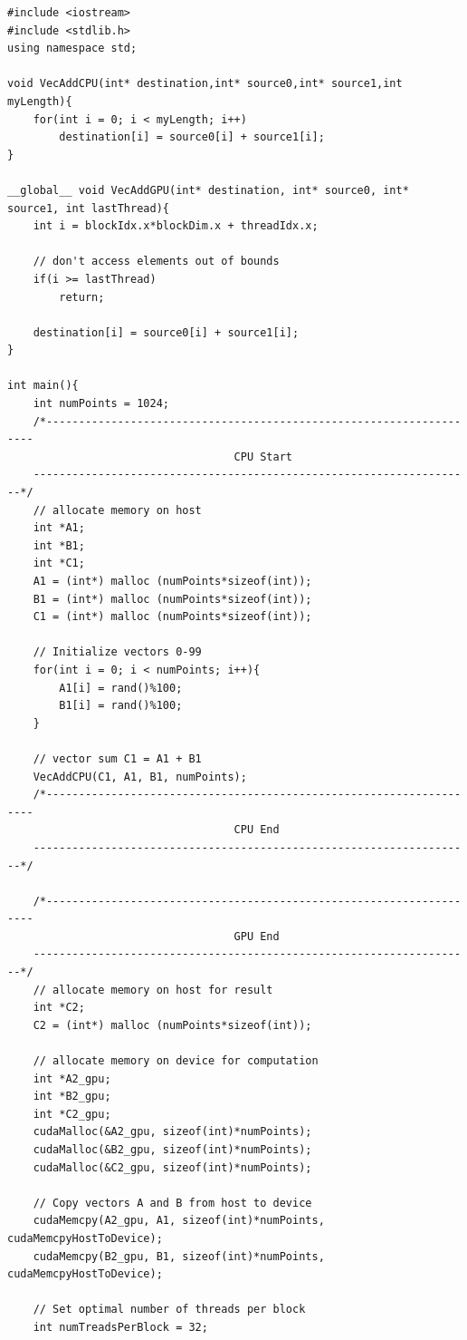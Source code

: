 \singlespacing
\clearpage
\begin{lstlisting}[caption={Comparison of CPU verse GPU code.},label={code:GPUvsCPU}]
#include <iostream>
#include <stdlib.h>
using namespace std;

void VecAddCPU(int* destination,int* source0,int* source1,int myLength){
	for(int i = 0; i < myLength; i++)
		destination[i] = source0[i] + source1[i];
}

__global__ void VecAddGPU(int* destination, int* source0, int* source1, int lastThread){
	int i = blockIdx.x*blockDim.x + threadIdx.x;
	
	// don't access elements out of bounds
	if(i >= lastThread)
		return;
	
	destination[i] = source0[i] + source1[i];
}

int main(){
	int numPoints = 1024;
	/*--------------------------------------------------------------------
                               	   CPU Start
	--------------------------------------------------------------------*/
	// allocate memory on host
	int *A1;
	int *B1;
	int *C1;
	A1 = (int*) malloc (numPoints*sizeof(int));
	B1 = (int*) malloc (numPoints*sizeof(int));
	C1 = (int*) malloc (numPoints*sizeof(int));

	// Initialize vectors 0-99
	for(int i = 0; i < numPoints; i++){
		A1[i] = rand()%100;
		B1[i] = rand()%100;
	}

	// vector sum C1 = A1 + B1
	VecAddCPU(C1, A1, B1, numPoints);
	/*--------------------------------------------------------------------
                               	   CPU End
	--------------------------------------------------------------------*/

	/*--------------------------------------------------------------------
                               	   GPU End
	--------------------------------------------------------------------*/
	// allocate memory on host for result
	int *C2;
	C2 = (int*) malloc (numPoints*sizeof(int));

	// allocate memory on device for computation
	int *A2_gpu;
	int *B2_gpu;
	int *C2_gpu;
	cudaMalloc(&A2_gpu, sizeof(int)*numPoints);
	cudaMalloc(&B2_gpu, sizeof(int)*numPoints);
	cudaMalloc(&C2_gpu, sizeof(int)*numPoints);

	// Copy vectors A and B from host to device
	cudaMemcpy(A2_gpu, A1, sizeof(int)*numPoints, cudaMemcpyHostToDevice);
	cudaMemcpy(B2_gpu, B1, sizeof(int)*numPoints, cudaMemcpyHostToDevice);

	// Set optimal number of threads per block
	int numTreadsPerBlock = 32;


\end{lstlisting}
